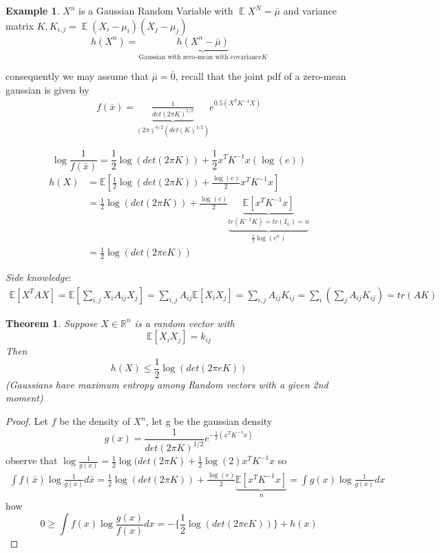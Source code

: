 \documentclass[twoside]{article}
\newtheorem{theorem}{Theorem}[section]
\theoremstyle{definition} %
\newtheorem{example}{Example}
\newcommand{\Ex}[1]{\mathbb{E}\left[#1\right]}
\def\R{\mathbb{R}}
\DeclareMathOperator{\E}{\mathbb{E}}%
\begin{document}
\begin{example}
  $X^n$ is a Gaussian Random Variable with $\E{X^N} = \bar{\mu}$ and variance matrix $K, K_{i,j} = \E{(X_i - \mu _i)(X_j - \mu_j)}$
  \[
    h(X^n) = \underbrace{h(X^n - \bar{\mu})}_{\text{Gaussian with zero-mean with covariance} K}
  \]

  consequently we may assume that $\bar{\mu} = \bar{0}$, recall that the joint pdf of a zero-mean gaussian is given by
  \begin{align*}
    f(\bar{x}) = \underbrace{\frac{1}{det(2 \pi K)^{1/2}}}_{(2 \pi)^{n/2} (det(K)^{1/2})} e^{0.5 (X^T K^{-1} X)}
  \end{align*}

  \[
    \log \frac{1}{f(\bar{x})} = \frac{1}{2} \log(det(2 \pi K)) + \frac{1}{2} x^T K^{-1} x(\log(e))
  \]
  \begin{align*}
    h(X) &= \Ex{\frac{1}{2} \log(det(2 \pi K)) + \frac{\log(e)}{2} x^T K^{-1} x } \\
    &= \frac{1}{2} \log(det(2 \pi K)) + \frac{\log(e)}{2} \underbrace{\underbrace{\Ex{x^T K^{-1} x}}_{tr(K^{-1}K) = tr(I_n) = n}}_{\frac{1}{2} \log(e^n)} \\
    &= \frac{1}{2} \log(det(2 \pi e K))
  \end{align*}

  \textit{Side knowledge}:
  \begin{align*}
    \Ex{X^T A X} = \Ex{\sum_{i,j} X_i A_{ij} X_j} = \sum_{i, j} A_{ij} \Ex{X_i X_j}
    = \sum_{i,j} A_{ij} K_{ij} = \sum_i (\sum_j A_{ij} K_{ij}) = tr(AK)
  \end{align*}
\end{example}

\begin{theorem}
  Suppose $X \in \R^n$ is a random vector with
  \[
    \Ex{X_i X_j} = k_{ij}
  \]
  Then
  \[
    h(X) \leq \frac{1}{2} \log(det(2 \pi e K))
  \]
  (Gaussians have maximum entropy among Random vectors with a given 2nd moment)
\end{theorem}

\begin{proof}
  Let $f$ be the density of $X^n$, let g be the gaussian density
  \[
    g(x) = \frac{1}{det(2 \pi K)^{1/2}} e^{-\frac{1}{2}(x^T K^{-1} x)}
  \]
  observe that $\log \frac{1}{g(x)} = \frac{1}{2} \log(det(2 \pi K) + \frac{1}{2} \log(2) x^T K^{-1} x$
  so
  \begin{align*}
    \int f(\bar{x}) \log \frac{1}{g(x)} d \bar{x} = \frac{1}{2} \log(det(2 \pi K)) + \frac{\log(e)}{2} \underbrace{\Ex{x^T K^{-1} x}}_{n}
    = \int g(x) \log \frac{1}{g(x)} dx
  \end{align*}
  how
  \[
    0 \geq \int f(x) \log \frac{g(x)}{f(x)} dx = - \{\frac{1}{2} \log(det(2 \pi e K))\} + h(x)
  \]
\end{proof}
\end{document}
